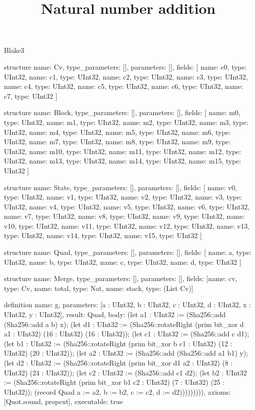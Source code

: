 \begin{lexlean}{Blake3}
\title{Natural number addition}
\begin{semanticmodule}
structure{
  name: Cv,
  type_parameters: [],
  parameters: [],
  fields: [
    {name: c0, type: UInt32},
    {name: c1, type: UInt32},
    {name: c2, type: UInt32},
    {name: c3, type: UInt32},
    {name: c4, type: UInt32},
    {name: c5, type: UInt32},
    {name: c6, type: UInt32},
    {name: c7, type: UInt32}
  ]
}

structure{
  name: Block,
  type_parameters: [],
  parameters: [],
  fields: [
    {name: m0, type: UInt32},
    {name: m1, type: UInt32},
    {name: m2, type: UInt32},
    {name: m3, type: UInt32},
    {name: m4, type: UInt32},
    {name: m5, type: UInt32},
    {name: m6, type: UInt32},
    {name: m7, type: UInt32},
    {name: m8, type: UInt32},
    {name: m9, type: UInt32},
    {name: m10, type: UInt32},
    {name: m11, type: UInt32},
    {name: m12, type: UInt32},
    {name: m13, type: UInt32},
    {name: m14, type: UInt32},
    {name: m15, type: UInt32}
  ]
}

structure{
  name: State,
  type_parameters: [],
  parameters: [],
  fields: [
    {name: v0, type: UInt32},
    {name: v1, type: UInt32},
    {name: v2, type: UInt32},
    {name: v3, type: UInt32},
    {name: v4, type: UInt32},
    {name: v5, type: UInt32},
    {name: v6, type: UInt32},
    {name: v7, type: UInt32},
    {name: v8, type: UInt32},
    {name: v9, type: UInt32},
    {name: v10, type: UInt32},
    {name: v11, type: UInt32},
    {name: v12, type: UInt32},
    {name: v13, type: UInt32},
    {name: v14, type: UInt32},
    {name: v15, type: UInt32}
  ]
}

structure{
  name: Quad,
  type_parameters: [],
  parameters: [],
  fields: [
    {name: a, type: UInt32},
    {name: b, type: UInt32},
    {name: c, type: UInt32},
    {name: d, type: UInt32}
  ]
}

structure{
  name: Merge,
  type_parameters: [],
  parameters: [],
  fields: [{name: cv, type: Cv}, {name: total, type: Nat}, {name: stack, type: (List Cv)}]
}

definition{
  name: g,
  parameters: [a : UInt32, b : UInt32, c : UInt32, d : UInt32, x : UInt32, y : UInt32],
  result: Quad,
  body: (let a1 : UInt32 := (Sha256::add (Sha256::add a b) x); (let d1 : UInt32 := (Sha256::rotateRight (prim bit_xor d a1 : UInt32) (16 : UInt32) (16 : UInt32)); (let c1 : UInt32 := (Sha256::add c d1); (let b1 : UInt32 := (Sha256::rotateRight (prim bit_xor b c1 : UInt32) (12 : UInt32) (20 : UInt32)); (let a2 : UInt32 := (Sha256::add (Sha256::add a1 b1) y); (let d2 : UInt32 := (Sha256::rotateRight (prim bit_xor d1 a2 : UInt32) (8 : UInt32) (24 : UInt32)); (let c2 : UInt32 := (Sha256::add c1 d2); (let b2 : UInt32 := (Sha256::rotateRight (prim bit_xor b1 c2 : UInt32) (7 : UInt32) (25 : UInt32)); (record Quad {a := a2, b := b2, c := c2, d := d2}))))))))),
  axioms: [Quot.sound, propext],
  executable: true
}


\end{semanticmodule}
\end{lexlean}
